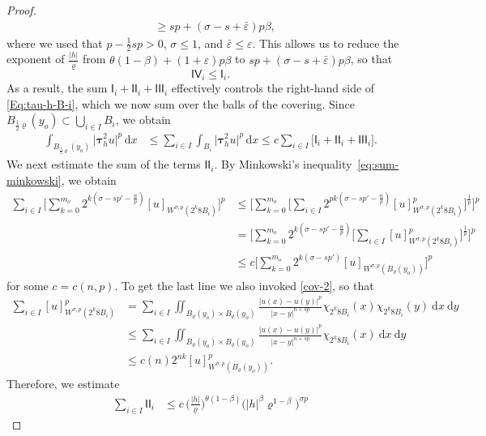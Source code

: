 \documentclass[10pt,letterpaper]{amsart}
\theoremstyle{definition}
\numberwithin{theorem}{section}
\numberwithin{equation}{section}
\newcommand{\1}{\ensuremath{\mathds{1}}}
\newcommand{\dx}{\mathrm{d}x}
\newcommand\sfI{{\boldsymbol{\mathsf I}}}
\newcommand\sfV{{\boldsymbol{\mathsf V}}}
\renewcommand{\epsilon}{\varepsilon}
\renewcommand{\rho}{\varrho}
\renewcommand{\epsilon}{\varepsilon}
\renewcommand{\rho}{\varrho}
\renewcommand{\d}{\:\! \mathrm{d}}
\numberwithin{equation}{section}
\begin{document}
\begin{proof}
\begin{align*}
    &\ge 
    sp + (\sigma-s+\bar\epsilon)p\beta, 
\end{align*}
where we used that $p-\tfrac12 sp>0$, $\sigma\le1$, and $\bar\varepsilon\le\varepsilon$. 
This allows us to reduce the exponent of $\frac{|h|}{\rho}$ from 
$\theta(1-\beta)+(1+\varepsilon)p\beta$ to $sp + (\sigma-s+\bar\varepsilon)p\beta$, 
so that 
\[
    \sfI\sfV_i \le \sfI_i.
\] 
As a result, the sum $\sfI_i + \sfI\sfI_i + \sfI\sfI\sfI_i$
effectively controls the right-hand side of \eqref{Eq:tau-h-B-i}, 
which we now sum over the balls of the covering. Since $B_{\frac12\rho}(y_o) \subset \bigcup_{i\in I} B_i$, we obtain
\begin{align*}
    \int_{B_{\frac12 \rho}(y_o)} \big|\boldsymbol\tau_h^2 u\big|^p \,\dx
    &\le
    \sum_{i\in I}
    \int_{B_i} \big|\boldsymbol\tau_h^2 u\big|^p \,\dx 
    \le
    c \sum_{i\in I}
    \big[ \sfI_i+\sfI\sfI_i + \sfI\sfI\sfI_i  \big].
\end{align*}
We next estimate the sum of the terms \(\sfI\sfI_i\).
By Minkowski’s inequality~\eqref{eq:sum-minkowski}, we obtain
\begin{align*}
        \sum_{i\in I}\Bigg[
        \sum_{k=0}^{m_o}
        2^{k(\sigma-sp' - \frac{n}{p})}
        [u]_{W^{\sigma,p}(2^k 8B_i)}
    \Bigg]^p 
    &\le \Bigg[\sum_{k=0}^{m_o}\bigg[\sum_{i\in I}2^{pk(\sigma-sp' - \frac{n}{p})}
        [u]^p_{W^{\sigma,p}(2^k 8B_i)}\bigg]^{\frac1p}\Bigg]^p\\
        &= \Bigg[\sum_{k=0}^{m_o}2^{k(\sigma-sp' - \frac{n}{p})}\bigg[\sum_{i\in I}
        [u]^p_{W^{\sigma,p}(2^k 8B_i)}\bigg]^{\frac1p}\Bigg]^p\\
        &\le c\Bigg[\sum_{k=0}^{m_o}2^{k(\sigma-sp')} 
        [u]_{W^{\sigma,p}(B_\rho(y_o))} \Bigg]^p
\end{align*}
for some $c=c(n,p)$. To get the last line we also invoked \eqref{cov-2}, so that
\begin{align*}
\sum_{i\in I}[u]^p_{W^{\sigma,p}(2^k 8B_i)}
&= \sum_{i\in I}\iint_{B_\rho(y_o)\times B_\rho(y_o)}\frac{|u(x)-u(y)|^p}{|x-y|^{n+sp}}\chi_{2^k 8B_i}(x)\chi_{2^k 8B_i}(y)\d x \d y\\
&\le
\sum_{i\in I}\iint_{B_\rho(y_o)\times B_\rho(y_o)}\frac{|u(x)-u(y)|^p}{|x-y|^{n+sp}}\chi_{2^k 8B_i}(x)\d x \d y\\
&\le c(n)2^{nk}[u]^p_{W^{\sigma,p}(B_\rho(y_o))}.
\end{align*}
Therefore, we estimate
\begin{align*}
    \sum_{i\in I} \sfI\sfI_i
    &\le
    c \,\Big(\frac{|h|}{\rho}\Big)^{\theta(1-\beta)} \big(|h|^\beta\rho^{1-\beta}\big)^{\sigma p}

\end{align*}
\end{proof}
\end{document}
